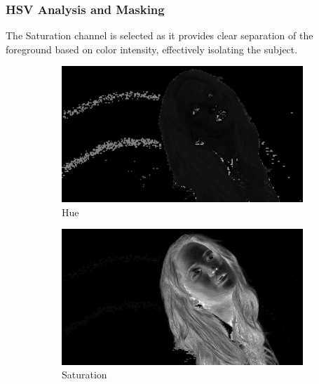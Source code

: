 \documentclass[11pt]{article}
\begin{document}
\subsubsection*{HSV Analysis and Masking}
The Saturation channel is selected as it provides clear separation of the foreground based on color intensity, effectively isolating the subject.
\begin{figure}[H]
    \centering
    \begin{subfigure}{0.3\textwidth}
        \includegraphics[width=\textwidth]{resources/jeniffer_hue.png}
        \caption{Hue}
    \end{subfigure}
    \hfill
    \begin{subfigure}{0.3\textwidth}
        \includegraphics[width=\textwidth]{resources/jeniffer_saturation.png}
        \caption{Saturation}
    \end{subfigure}
    \hfill
    \begin{subfigure}{0.3\textwidth}

\end{subfigure}
\end{figure}
\end{document}
